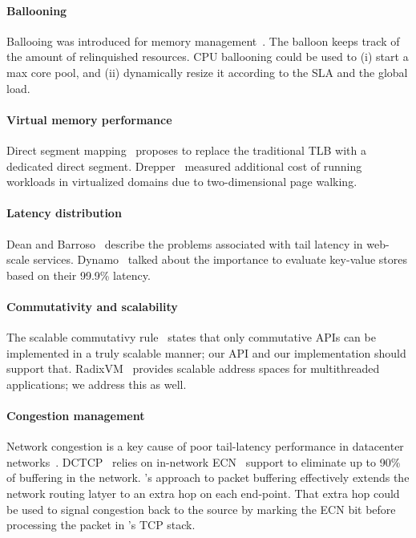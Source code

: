 \paragraph*{Ballooning}
Ballooing was introduced for memory
management~\cite{DBLP:conf/osdi/Waldspurger02}.  The balloon keeps
track of the amount of relinquished resources.  CPU ballooning could
be used to (i) start a max core pool, and (ii) dynamically resize it
according to the SLA and the global load.

\paragraph*{Virtual memory performance}  
Direct segment mapping~\cite{DBLP:conf/isca/BasuGCHS13} proposes to
replace the traditional TLB with a dedicated direct segment.
Drepper~\cite{DBLP:journals/queue/Drepper08} measured additional cost
of running workloads in virtualized domains due to two-dimensional
page walking.

\paragraph*{Latency distribution}  
Dean and Barroso~\cite{DBLP:journals/cacm/DeanB13} describe the
problems associated with tail latency in web-scale services.
Dynamo~\cite{DBLP:conf/sosp/DeCandiaHJKLPSVV07} talked about the
importance to evaluate key-value stores based on their 99.9\% latency.


\paragraph*{Commutativity and scalability} 
The scalable commutativy rule~\cite{DBLP:conf/sosp/ClementsKZMK13}
states that only commutative APIs can be implemented in a truly
scalable manner; our API and our implementation should support that.
RadixVM~\cite{DBLP:conf/eurosys/ClementsKZ13} provides scalable
address spaces for multithreaded applications; we address this as well.

\paragraph*{Congestion management}
Network congestion is a key cause of poor tail-latency performance in
datacenter networks~\cite{DBLP:conf/sigcomm/AlizadehGMPPPSS10}.
DCTCP~\cite{DBLP:conf/sigcomm/AlizadehGMPPPSS10} relies on in-network
ECN~\cite{ramakrishnan2001addition} support to eliminate up to 90\% of buffering in the network.
\ix's approach to packet buffering effectively extends the network
routing latyer to an extra hop on each end-point.  That extra hop could
be used to signal congestion back to the source by marking the ECN bit
before processing the packet in \ix's TCP stack.

